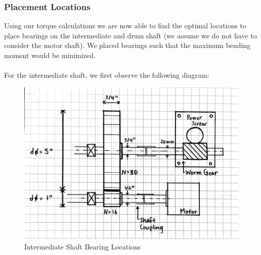 \documentclass[letterpaper,12pt]{article}
\begin{document}
\subsubsection{Placement Locations}
Using our torque calculations we are now able to find the optimal locations to place bearings on the intermediate and drum shaft (we assume we do not have to consider the motor shaft). We placed bearings such that the maximum bending moment would be minimized.\\\\
For the intermediate shaft, we first observe the following diagram:
\begin{figure}[!ht]
\includegraphics[width=16cm]{MECH325A1System}
\caption{Intermediate Shaft Bearing Locations}
\end{figure}
\end{document}
